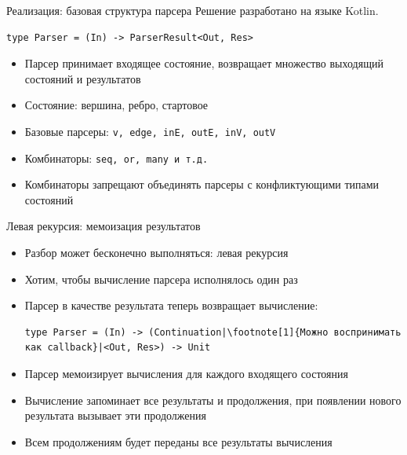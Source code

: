 \documentclass[aspectratio=169]{beamer}
\begin{document}

\begin{frame}[fragile]{Реализация: базовая структура парсера}
  Решение разработано на языке Kotlin.
  \begin{verbatim}
type Parser = (In) -> ParserResult<Out, Res>
  \end{verbatim}
  \begin{itemize}
    \item Парсер принимает входящее состояние, возвращает множество выходящий состояний и результатов
    \item Состояние: вершина, ребро, стартовое
    \item Базовые парсеры: \texttt{v, edge, inE, outE, inV, outV}
    \item Комбинаторы: \texttt{seq, or, many и т.д.}
    \item Комбинаторы запрещают объединять парсеры с конфликтующими типами состояний
  \end{itemize}

\end{frame}




\begin{frame}[fragile]{Левая рекурсия: мемоизация результатов}
  \begin{itemize}
    \item Разбор может бесконечно выполняться: левая рекурсия

    \item Хотим, чтобы вычисление парсера исполнялось один раз

    \item Парсер в качестве результата теперь возвращает вычисление:
          \begin{verbatim}
type Parser = (In) -> (Continuation|\footnote[1]{Можно воспринимать как callback}|<Out, Res>) -> Unit
\end{verbatim}
    \item Парсер мемоизирует вычисления для каждого входящего состояния

    \item Вычисление запоминает все результаты и продолжения, при появлении нового результата вызывает эти продолжения

    \item Всем продолжениям будет переданы все результаты вычисления

  \end{itemize}
\end{frame}
\end{document}
